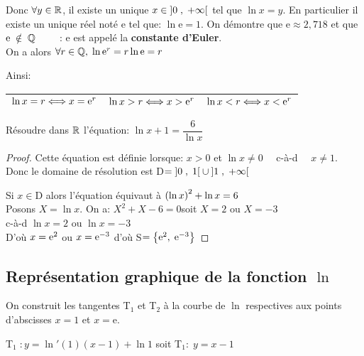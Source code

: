 Donc $ \forall y \in \mathbb{R} $,  il existe un unique $ x\in \left]0 \;,\; +\infty\right[ $ tel que $ \ln x=y. $  En particulier il existe un unique réel noté $ \mathrm{e} $ tel que:  $\ln \mathrm{e}=1 $.
On démontre que $ \mathrm{e}\approx 2,718 $    et que  $  \mathrm{e}\;\notin\; \mathbb{Q}\qquad$ :  $ \mathrm{e }$ est appelé la  \textbf{ constante d'Euler}.\\
On a alors  $ \forall r \in \mathbb{Q}, \; \ln \mathrm{e}^{r}=r\ln \mathrm{e}=r $


Ainsi:


\begin{tabularx}{\textwidth}{|X|X|X|}
\hline
$ \ln x = r  \Longleftrightarrow x = \mathrm{e}^{r} $&
$ \ln x  > r \Longleftrightarrow x >\mathrm{e}^{r} $&
$ \ln x  < r\Longleftrightarrow x <   \mathrm{e}^{r} $\\
\hline
\end{tabularx}

\begin{exercice}

Résoudre dans $ \mathbb{R} $  l'équation:\; $ \ln x+1=\dfrac{6}{\ln x} $
\end{exercice}
\begin{proof}
Cette équation est définie lorsque:\; $ x>  0$\;  et\;  $\ln x \neq 0 \quad$ \; c-à-d \; $\quad x\neq 1. $ \\

 Donc le domaine de résolution est  \;D$ =\left]0 \;,\; 1\right[ \cup \left]1 \;,\; +\infty\right[ $

Si $ x \in $D alors  l'équation équivaut à  $ \left(\ln x\right)^{2}+ \ln x= 6 $\\

Posons \quad $  X= \ln x $.\; On a:\;  $ X^{2}+X-6=0$\quad  soit \;  $X=2 $ \;ou \; $X=-3 $\\

c-à-d \;  $ \ln x=2 $\; ou \; $ \ln x=-3 $\\

D'où\; $x=\mathrm{e}^{2} $   \; ou \; $x= \mathrm{e}^{-3} $ \;  d'où \; S$ =\left\{\mathrm{e}^{2},\;\mathrm{e}^{-3} \right\} $

\end{proof}

\subsection*{Représentation graphique de la fonction $ \ln $}
On construit les tangentes  T$ _{1} $   et T$ _{2} $ à la courbe de $ \ln $   respectives  aux points  d'abscisses $ x=1$ et $x= \mathrm{e} $.

 T$ _{1} \;: y= \ln'(1)(x-1) +\ln1$ \; soit \; T$ _{1}:\;y=x-1 $ 
 
